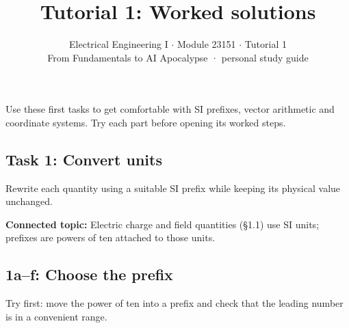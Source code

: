 \documentclass[11pt]{article}
\title{\sffamily\bfseries\color{FAUblue}Tutorial 1: Worked solutions}
\author{Electrical Engineering I \ensuremath{\cdot} Module 23151 \ensuremath{\cdot} Tutorial 1\\[2pt]\small From Fundamentals to AI Apocalypse · personal study guide}
\date{}
\begin{document}
\maketitle
\begingroup\footnotesize\setlength{\parskip}{0pt}\tableofcontents\endgroup
\clearpage

{\large Use these first tasks to get comfortable with SI prefixes, vector arithmetic and coordinate systems. Try each part before opening its worked steps.}


\begin{keepsection}
\section{Task 1: Convert units}

Rewrite each quantity using a suitable SI prefix while keeping its physical value unchanged.

\textbf{Connected topic:} Electric charge and field quantities (§1.1) use SI units; prefixes are powers of ten attached to those units.

\begin{keepsection}
\subsection{1a–f: Choose the prefix}

Try first: move the power of ten into a prefix and check that the leading number is in a convenient range.

\end{keepsection}
\end{keepsection}
\end{document}
